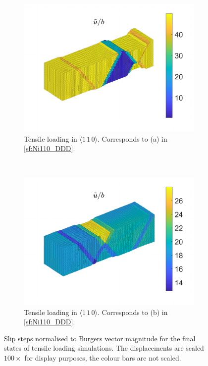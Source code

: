 \begin{figure}
    \begin{subfigure}[t]{0.45\linewidth}
        \centering
        \includegraphics[width=\linewidth]{../data/11-Mar-2021_4_tensile_ni_110_205600_disp.pdf}
        \caption{Tensile loading in $\langle 1\, 1\, 0 \rangle$. Corresponds to (a) in \cref{sf:Ni110_DDD}.}
        \label{sf:Ni110a_disp}
    \end{subfigure}
    ~
    \begin{subfigure}[t]{0.45\linewidth}
        \centering
        \includegraphics[width=\linewidth]{../data/16-Mar-2021_4_tensile_ni_110_225000_disp.pdf}
        \caption{Tensile loading in $\langle 1\, 1\, 0 \rangle$. Corresponds to (b) in \cref{sf:Ni110_DDD}.}
        \label{sf:Ni110b_disp}
    \end{subfigure}
    \caption[Slip steps normalised to Burgers vector magnitude for the final states of tensile loading simulations.]{Slip steps normalised to Burgers vector magnitude for the final states of tensile loading simulations. The displacements are scaled $100\times$ for display purposes, the colour bars are not scaled.}
    \label{f:slipSteps}
\end{figure}


